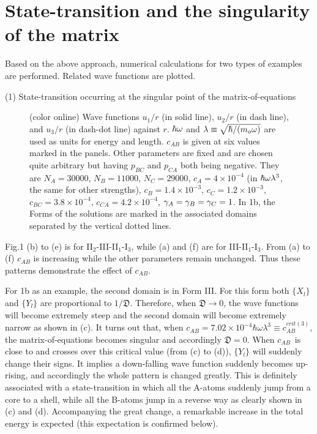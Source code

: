 \documentclass[single-column,showpacs,groupedaddress]{revtex4}
\begin{document}
\section*{State-transition and the singularity of the matrix}

Based on the above approach, numerical calculations for two types of
examples are performed. Related wave functions are plotted.

(1) State-transition occurring at the singular point of the
matrix-of-equations

\begin{figure}[tbp]
\centering {}
\caption{(color online) Wave functions $u_1/r$ (in solid line), $u_2/r$ (in
dash line), and $u_3/r$ (in dash-dot line) against $r$. $\hbar \protect%
\omega $ and $\protect\lambda\equiv\protect\sqrt{\hbar/(m_o\protect\omega)}$
are used as units for energy and length. $c_{AB}$ is given at six values
marked in the panels. Other parameters are fixed and are chosen quite
arbitrary but having $p_{BC}$ and $p_{CA}$ both being negative. They are $%
N_A=30000$, $N_B=11000$, $N_C=29000$, $c_A=4\times 10^{-4}$ (in $\hbar%
\protect\omega\protect\lambda^3$, the same for other strengths), $%
c_B=1.4\times 10^{-3}$, $c_C=1.2\times 10^{-3}$, $c_{BC}=3.8\times 10^{-4}$,
$c_{CA}=4.2\times 10^{-4} $, $\protect\gamma_A=\protect\gamma_B=\protect%
\gamma_C=1$. In 1b, the Forms of the solutions are marked in the associated
domains separated by the vertical dotted lines.}
\label{Fig:1}
\end{figure}

Fig.1 (b) to (e) is for II$_{2}$-III-II$_{1}$-I$_{3}$, while (a) and (f) are
for III-II$_{1}$-I$_{3}$. From (a) to (f) $c_{AB}$ is increasing while the
other parameters remain unchanged. Thus these patterns demonstrate the effect
of $c_{AB}$.

For 1b as an example, the second domain is in Form III. For this form both $%
\{X_{l}\}$ and $\{Y_{l}\}$ are proportional to $1/\mathfrak{D}$. Therefore,
when $\mathfrak{D}\rightarrow 0$, the wave functions will become extremely
steep and the second domain will become extremely narrow as shown in (c). It
turns out that, when $c_{AB}=7.02\times 10^{-4}\hbar \omega \lambda
^{3}\equiv c_{AB}^{crit(3)}$, the matrix-of-equations becomes singular and
accordingly $\mathfrak{D}=0$. When $c_{AB}$\ is close to and crosses over
this critical value (from (c) to (d)), $\{Y_{l}\}$ will suddenly change
their signs. It implies a down-falling wave function suddenly becomes
up-rising, and accordingly the whole pattern is changed greatly. This is
definitely associated with a state-transition in which all the A-atoms
suddenly jump from a core to a shell, while all the B-atoms jump in a
reverse way as clearly shown in (c) and (d). Accompanying the great change,
a remarkable increase in the total energy is expected (this expectation is
confirmed below).
\end{document}
